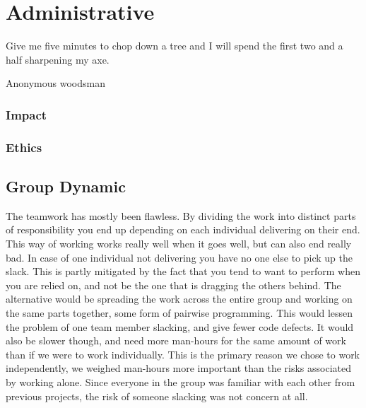 \section{Administrative}
\epigraph{Give me five minutes to chop down a tree and I will spend the first two and a half sharpening my axe.}{Anonymous woodsman}
\subsubsection{Impact}
\subsubsection{Ethics}


\subsection{Group Dynamic}
The teamwork has mostly been flawless. By dividing the work into distinct parts of responsibility you end up depending on each individual delivering on their end. This way of working works really well when it goes well, but can also end really bad. In case of one individual not delivering you have no one else to pick up the slack. This is partly mitigated by the fact that you tend to want to perform when you are relied on, and not be the one that is dragging the others behind. The alternative would be spreading the work across the entire group and working on the same parts together, some form of pairwise programming. This would lessen the problem of one team member slacking, and give fewer code defects. It would also be slower though, and need more man-hours for the same amount of work than if we were to work individually. This is the primary reason we chose to work independently, we weighed man-hours more important than the risks associated by working alone. Since everyone in the group was familiar with each other from previous projects, the risk of someone slacking was not concern at all.

